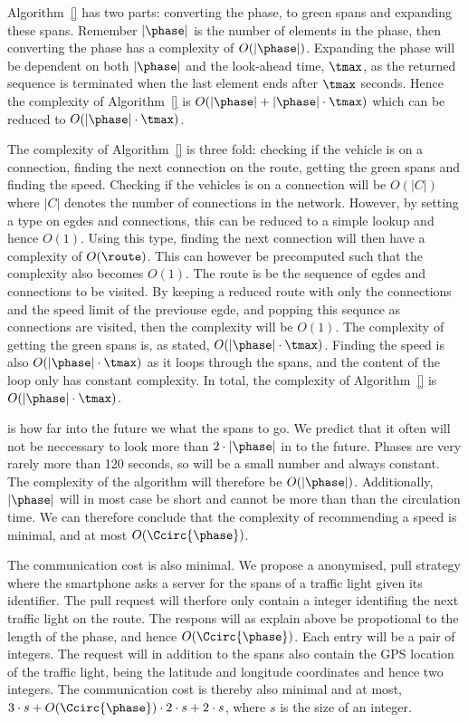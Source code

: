 Algorithm~\ref{} has two parts: converting the phase, \phase to green spans and expanding these spans.
Remember $|\phase|$ is the number of elements in the phase, then converting the phase has a complexity of $O(|\phase|)$.
Expanding the phase will be dependent on both $|\phase|$ and the look-ahead time, $\tmax$, as the returned sequence is terminated when the last element ends after $\tmax$ seconds.
Hence the complexity of Algorithm~\ref{} is  $O(|\phase|+ |\phase|\cdot \tmax)$ which can be reduced to $O(|\phase|\cdot \tmax)$.

The complexity of Algorithm~\ref{} is three fold: checking if the vehicle is on a connection, finding the next connection on the route, getting the green spans and finding the speed.
Checking if the vehicles is on a connection will be $O(|C|)$ where $|C|$ denotes the number of connections in the network.
However, by setting a type on egdes and connections, this can be reduced to a simple lookup and hence $O(1)$.
Using this type, finding the next connection will then have a complexity of $O(\route)$.
This can however be precomputed such that the complexity also becomes $O(1)$.
The route is be the sequence of egdes and connections to be visited.
By keeping a reduced route with only the connections and the speed limit of the previouse egde, and popping this sequnce as connections are visited, then the complexity will be $O(1)$.
The complexity of getting the green spans is, as stated, $O(|\phase|\cdot \tmax)$.
Finding the speed is also $O(|\phase|\cdot \tmax)$ as it loops through the spans, and the content of the loop only has constant complexity.
In total, the complexity of Algorithm~\ref{} is $O(|\phase|\cdot\tmax)$.

\tmax is how far into the future we what the spans to go.
We predict that it often will not be neccessary to look more than $2\cdot |\phase|$ in to the future.
Phases are very rarely more than 120 seconds, so \tmax will be a small number and always constant.
The complexity of the algorithm will therefore be $O(|\phase|)$.
Additionally, $|\phase|$ will in most case be short and cannot be more than than the circulation time.
We can therefore conclude that the complexity of recommending a speed is minimal, and at most $O(\Ccirc{\phase})$.

The communication cost is also minimal.
We propose a anonymised, pull strategy where the smartphone asks a server for the spans of a traffic light given its identifier.
The pull request will therfore only contain a integer identifing the next traffic light on the route.
The respons will as explain above be propotional to the length of the phase, and hence $O(\Ccirc{\phase})$.
Each entry will be a pair of integers.
The request will in addition to the spans also contain the GPS location of the traffic light, being the latitude and longitude coordinates and hence two integers.
The communication cost is thereby also minimal and at most, $3\cdot s + O(\Ccirc{\phase})\cdot 2\cdot s + 2\cdot s$, where $s$ is the size of an integer.








